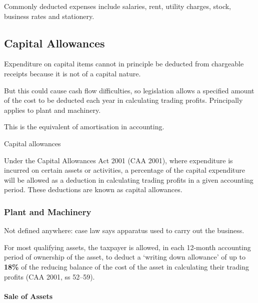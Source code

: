 \documentclass[
]{article}
\newenvironment{env-2f161b0c-3bbb-42f2-a685-2a4a488d7eb3}
{
    \savenotes\tcolorbox[blanker,breakable,left=5pt,borderline west={2pt}{-4pt}{yellow}]
}
{
    \endtcolorbox\spewnotes
}
\begin{document}
Commonly deducted expenses include salaries, rent, utility charges,
stock, business rates and stationery.

\hypertarget{capital-allowances}{%
\subsection{Capital Allowances}\label{capital-allowances}}

Expenditure on capital items cannot in principle be deducted from
chargeable receipts because it is not of a capital nature.

But this could cause cash flow difficulties, so legislation allows a
specified amount of the cost to be deducted each year in calculating
trading profits. Principally applies to plant and machinery.

This is the equivalent of amortisation in accounting.

\begin{env-2f161b0c-3bbb-42f2-a685-2a4a488d7eb3}

Capital allowances

Under the Capital Allowances Act 2001 (CAA 2001), where expenditure is
incurred on certain assets or activities, a percentage of the capital
expenditure will be allowed as a deduction in calculating trading
profits in a given accounting period. These deductions are known as
capital allowances.

\end{env-2f161b0c-3bbb-42f2-a685-2a4a488d7eb3}

\hypertarget{plant-and-machinery}{%
\subsubsection{Plant and Machinery}\label{plant-and-machinery}}

Not defined anywhere: case law says apparatus used to carry out the
business.

For most qualifying assets, the taxpayer is allowed, in each 12-month
accounting\\
period of ownership of the asset, to deduct a `writing down allowance'
of up to \textbf{18\%} of the reducing balance of the cost of the asset
in calculating their trading profits (CAA 2001, ss 52--59).

\hypertarget{sale-of-assets}{%
\paragraph{Sale of Assets}\label{sale-of-assets}}
\end{document}
